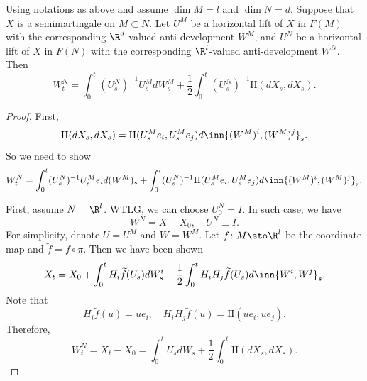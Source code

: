 \begin{thm}
    Using notations as above and assume $\dim M = l$ and $\dim N = d$. Suppose that $X$ is a semimartingale on $M \subset N$. Let $U^M$ be a horizontal lift of $X$ in $F(M)$ with the corresponding $\R^d$-valued anti-development $W^M$, and $U^N$ be a horizontal lift of $X$ in $F(N)$ with the corresponding $\R^l$-valued anti-development $W^N$. Then
    \begin{equation*}
        W^N_t = \int_0^t (U^N_s)^{-1}U^M_sdW^M_s + \frac{1}{2} \int_0^t(U^N_s)^{-1}\mathrm{II}(dX_s,dX_s).
    \end{equation*}
\end{thm}
\begin{proof}
    First,
    \begin{equation*}
        \mathrm{II}(dX_s,dX_s) = \mathrm{II}(U^M_se_i,U^M_se_j)d\inn{(W^M)^i,(W^M)^j}_s.
    \end{equation*}
    So we need to show
    \begin{equation*}
        W^N_t = \int_0^t (U^N_s)^{-1}U^M_se_id(W^M)_s + \int_0^t(U^N_s)^{-1}\mathrm{II}(U^M_se_i,U^M_se_j)d\inn{(W^M)^i,(W^M)^j}_s.
    \end{equation*}

    First, assume $N = \R^l$. WTLG, we can choose $U^N_0 = I$. In such case, we have
    \begin{equation*}
        W^N = X - X_0,\quad U^N \equiv I.
    \end{equation*}
    For simplicity, denote $U = U^M$ and $W = W^M$. Let $f \colon M \sto \R^l$ be the coordinate map and $\widetilde{f} = f \circ \pi$. Then we have been shown
    \begin{equation*}
        X_t = X_0 + \int_0^t H_i\widetilde{f}(U_s)dW^i_s + \frac{1}{2}\int_0^tH_iH_j\widetilde{f}(U_s) d\inn{W^i,W^j}_s.
    \end{equation*}
    Note that
    \begin{equation*}
        H_i \widetilde{f}(u)=u e_i, \quad H_i H_j \widetilde{f}(u)=\mathrm{II}(ue_i,ue_j).
    \end{equation*}
    Therefore,
    \begin{equation*}
        W^N_t = X_t - X_0 = \int_0^t U_s d W_s+\frac{1}{2} \int_0^t \mathrm{II}\left(d X_s, d X_s\right).
    \end{equation*}


\end{proof}
